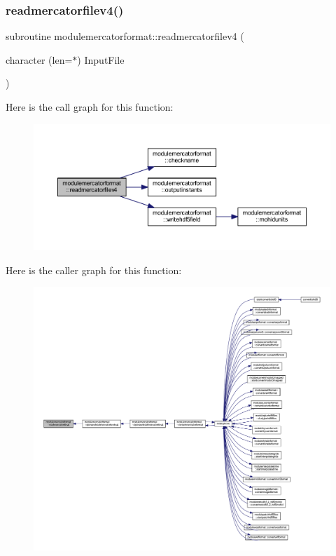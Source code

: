 \subsubsection{\texorpdfstring{readmercatorfilev4()}{readmercatorfilev4()}}
{\footnotesize\ttfamily subroutine modulemercatorformat\+::readmercatorfilev4 (\begin{DoxyParamCaption}\item[{character (len=$\ast$)}]{Input\+File }\end{DoxyParamCaption})\hspace{0.3cm}{\ttfamily [private]}}

Here is the call graph for this function\+:\nopagebreak
\begin{figure}[H]
\begin{center}
\leavevmode
\includegraphics[width=350pt]{namespacemodulemercatorformat_a5bdb4983fc890f8f3c9d524bd6516d2c_cgraph}
\end{center}
\end{figure}
Here is the caller graph for this function\+:\nopagebreak
\begin{figure}[H]
\begin{center}
\leavevmode
\includegraphics[width=350pt]{namespacemodulemercatorformat_a5bdb4983fc890f8f3c9d524bd6516d2c_icgraph}
\end{center}
\end{figure}
\mbox{\label{namespacemodulemercatorformat_a66a44152e01a257880168d77ee61a18d}} 
